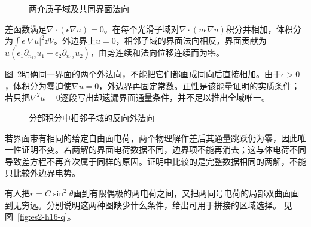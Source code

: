 \begin{figure}[H]\centering
{}
\caption{两介质子域及共同界面法向}\label{fig:es2-h15-q}
\end{figure}
\begin{solution}
差函数满足$\nabla\cdot(\epsilon\nabla u)=0$。在每个光滑子域对$\nabla\cdot(u\epsilon\nabla u)$积分并相加，体积分为$\int\epsilon|\nabla u|^2\dd V$。外边界上$u=0$，相邻子域的界面法向相反，界面贡献为$u(\epsilon_1\partial_{n_{12}}u_1-\epsilon_2\partial_{n_{12}}u_2)$，由势连续和法向位移连续而为零。

图~\ref{fig:es2-h15-s}明确同一界面的两个外法向，不能把它们都画成同向后直接相加。由于$\epsilon>0$，体积分为零迫使$\nabla u=0$，外边界再固定常数。正性是该能量证明的实质条件；若只把$\nabla^2u=0$逐段写出却遗漏界面通量条件，并不足以推出全域唯一。
\begin{figure}[H]\centering
{}
\caption{分部积分中相邻子域的反向外法向}\label{fig:es2-h15-s}
\end{figure}


若界面带有相同的给定自由面电荷，两个物理解作差后其通量跳跃仍为零，因此唯一性证明不变。若两解的界面电荷数据不同，边界项不能再消去；这与体电荷不同导致差方程不再齐次属于同样的原因。证明中比较的是完整数据相同的两解，不能只比较外边界电势。
\end{solution}

\begin{exercise}[从场图识别近似范围]\label{ex:es2-h16}
有人把$r=C\sin^2\theta$画到有限偶极的两电荷之间，又把两同号电荷的局部双曲面画到无穷远。分别说明这两种图缺少什么条件，给出可用于拼接的区域选择。 见图~\ref{fig:es2-h16-q}。
\end{exercise}

